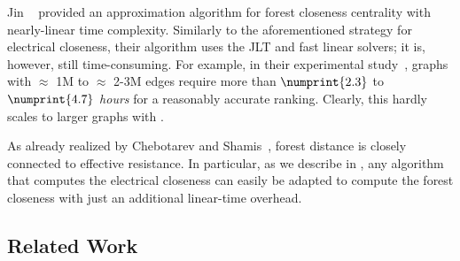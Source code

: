 Jin \etal~\cite{DBLP:conf/icdm/JinBZ19} provided an approximation algorithm for
forest closeness centrality with nearly-linear time complexity. Similarly to
the aforementioned strategy for electrical closeness, their algorithm uses the
JLT and fast linear solvers; it is, however, still time-consuming. For example,
in their experimental study~\cite{DBLP:conf/icdm/JinBZ19}, graphs with
$\approx$ 1M to $\approx$ 2-3M edges require more than $\numprint{2.3}$ to
$\numprint{4.7}$ \emph{hours} for a reasonably accurate ranking. Clearly, this
hardly scales to larger graphs with .

As already realized by Chebotarev and Shamis~\cite{chebotarev2000forest},
forest distance is closely connected to effective resistance. In particular, as
we describe in , any algorithm that
computes the electrical closeness can easily be adapted to compute the forest
closeness with just an additional linear-time overhead.

\subsection{Related Work}
